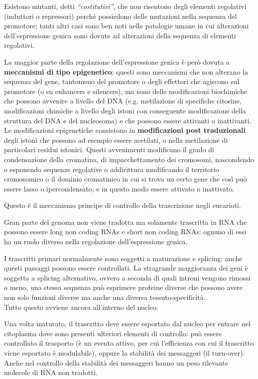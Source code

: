 \documentclass[11pt]{book}
\begin{document}
Esistono mutanti, detti \emph{``costitutivi''}, che non risentono degli elementi regolativi (induttori o repressori) perché possiedono delle mutazioni nella sequenza del promotore; tanti altri casi sono ben noti nelle patologie umane in cui alterazioni dell’espressione genica sono dovute ad alterazioni della sequenza di elementi regolativi. 

La maggior parte della regolazione dell’espressione genica è però dovuta a \textbf{meccanismi di tipo epigenetico}: questi sono meccanismi che non alterano la sequenza del gene, tantomeno del promotore o degli effettori che agiscono sul promotore (o su enhancers e silencers), ma sono delle modificazioni biochimiche che possono avvenire a livello del DNA (e.g. metilazione di specifiche citosine, modificazioni chimiche a livello degli istoni con conseguente modificazione della struttura del DNA e del nucleosoma) e che possono essere attivanti o inattivanti. Le modificazioni epigenetiche consistono in \textbf{modificazioni post traduzionali} degli istoni che possono ad esempio essere acetilati, o nella metilazione di particolari residui istonici. Questi avvenimenti modificano il grado di condensazione della cromatina, di impacchettamento dei cromosomi, nascondendo o esponendo sequenze regolative o addirittura modificando il territorio cromosomico o il dominio cromatinico in cui si trova un certo gene che così può essere lasso o ipercondensato, e in questo modo essere attivato o inattivato.

Questo è il meccanismo principe di controllo della trascrizione negli eucarioti.

Gran parte del genoma non viene tradotta ma solamente trascritta in RNA che possono essere long non coding RNAs e short non coding RNAs: ognuno di essi ha un ruolo diverso nella regolazione dell’espressione genica.

I trascritti primari normalmente sono soggetti a maturazione e splicing: anche questi passaggi possono essere controllati. La stragrande maggioranza dei geni è soggetta a splicing alternativo, ovvero a seconda di quali introni vengono rimossi o meno, una stessa sequenza può esprimere proteine diverse che possono avere non solo funzioni diverse ma anche una diversa tessuto-specificità.\\ Tutto questo avviene ancora all’interno del nucleo.

Una volta maturato, il trascritto deve essere esportato dal nucleo per entrare nel citoplasma dove sono presenti ulteriori elementi di controllo: può essere controllato il trasporto (è un evento attivo, per cui l’efficienza con cui il trascritto viene esportato è modulabile), oppure la stabilità dei messaggeri (il turn-over). Anche nel controllo della stabilità dei messaggeri hanno un peso rilevante molecole di RNA non tradotti.
\end{document}
